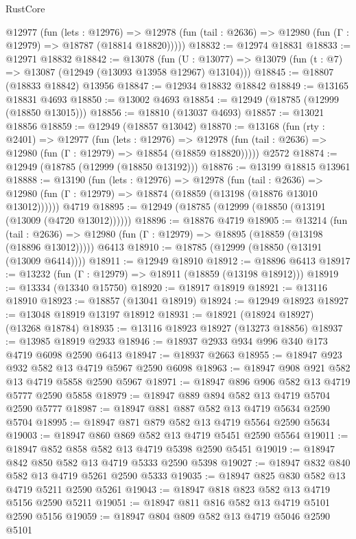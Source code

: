 \begin{lexlean}{RustCore}
\begin{coremodule}
    @12977
      (fun (lets : @12976) =>
      @12978 (fun (tail : @2636) => @12980 (fun (Γ : @12979) => @18787 (@18814 @18820)))))
@18832 := @12974 @18831
@18833 := @12971 @18832
@18842 := @13078
    (fun (U : @13077) => @13079 (fun (t : @7) => @13087 (@12949 (@13093 @13958 @12967) @13104)))
@18845 := @18807 (@18833 @18842) @13956
@18847 := @12934 @18832 @18842
@18849 := @13165 @18831 @4693
@18850 := @13002 @4693
@18854 := @12949 (@18785 (@12999 (@18850 @13015)))
@18856 := @18810 (@13037 @4693)
@18857 := @13021 @18856
@18859 := @12949 (@18857 @13042)
@18870 := @13168
    (fun (rty : @2401) =>
    @12977
      (fun (lets : @12976) =>
      @12978 (fun (tail : @2636) => @12980 (fun (Γ : @12979) => @18854 (@18859 @18820)))))
    @2572
@18874 := @12949 (@18785 (@12999 (@18850 @13192)))
@18876 := @13199 @18815 @13961
@18888 := @13190
    (fun (lets : @12976) =>
    @12978
      (fun (tail : @2636) =>
      @12980 (fun (Γ : @12979) => @18874 (@18859 (@13198 (@18876 @13010 @13012))))))
    @4719
@18895 := @12949 (@18785 (@12999 (@18850 (@13191 (@13009 (@4720 @13012))))))
@18896 := @18876 @4719
@18905 := @13214
    (fun (tail : @2636) => @12980 (fun (Γ : @12979) => @18895 (@18859 (@13198 (@18896 @13012)))))
    @6413
@18910 := @18785 (@12999 (@18850 (@13191 (@13009 @6414))))
@18911 := @12949 @18910
@18912 := @18896 @6413
@18917 := @13232 (fun (Γ : @12979) => @18911 (@18859 (@13198 @18912)))
@18919 := @13334 (@13340 @15750)
@18920 := @18917 @18919
@18921 := @13116 @18910
@18923 := @18857 (@13041 @18919)
@18924 := @12949 @18923
@18927 := @13048 @18919 @13197 @18912
@18931 := @18921 (@18924 @18927) (@13268 @18784)
@18935 := @13116 @18923 @18927 (@13273 @18856)
@18937 := @13985 @18919 @2933
@18946 := @18937 @2933 @934 @996 @340 @173 @4719 @6098 @2590 @6413
@18947 := @18937 @2663
@18955 := @18947 @923 @932 @582 @13 @4719 @5967 @2590 @6098
@18963 := @18947 @908 @921 @582 @13 @4719 @5858 @2590 @5967
@18971 := @18947 @896 @906 @582 @13 @4719 @5777 @2590 @5858
@18979 := @18947 @889 @894 @582 @13 @4719 @5704 @2590 @5777
@18987 := @18947 @881 @887 @582 @13 @4719 @5634 @2590 @5704
@18995 := @18947 @871 @879 @582 @13 @4719 @5564 @2590 @5634
@19003 := @18947 @860 @869 @582 @13 @4719 @5451 @2590 @5564
@19011 := @18947 @852 @858 @582 @13 @4719 @5398 @2590 @5451
@19019 := @18947 @842 @850 @582 @13 @4719 @5333 @2590 @5398
@19027 := @18947 @832 @840 @582 @13 @4719 @5261 @2590 @5333
@19035 := @18947 @825 @830 @582 @13 @4719 @5211 @2590 @5261
@19043 := @18947 @818 @823 @582 @13 @4719 @5156 @2590 @5211
@19051 := @18947 @811 @816 @582 @13 @4719 @5101 @2590 @5156
@19059 := @18947 @804 @809 @582 @13 @4719 @5046 @2590 @5101

\end{coremodule}
\end{lexlean}
